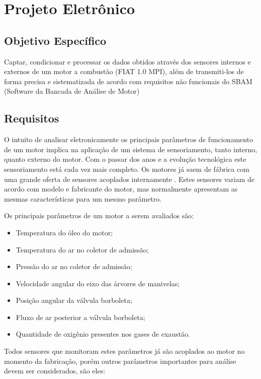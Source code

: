 \chapter[Projeto Eletrônico]{Projeto Eletrônico}

\section{Objetivo Específico}

Captar, condicionar e processar os dados obtidos através dos sensores internos e externos de um motor a combustão (FIAT 1.0 MPI), além de transmiti-los de forma precisa e sistematizada de acordo com requisitos não funcionais do SBAM (Software da Bancada de Análise de Motor)

\section{Requisitos}

O intuito de analisar eletronicamente os principais parâmetros de funcionamento de um motor implica na aplicação de um sistema de sensoriamento, tanto interno, quanto externo do motor. Com o passar dos anos e a evolução tecnológica este sensoriamento está cada vez mais completo. Os motores já saem de fábrica com uma grande oferta de sensores acoplados internamente \cite{valle2004mapping}. Estes sensores variam de acordo com modelo e fabricante do motor, mas normalmente apresentam as mesmas características para um mesmo parâmetro.

Os principais parâmetros de um motor a serem avaliados são:

\begin{itemize}
	\item Temperatura do óleo do motor;
	\item Temperatura do ar no coletor de admissão;
	\item Pressão do ar no coletor de admissão;
	\item Velocidade angular do eixo das árvores de manivelas;
	\item Posição angular da válvula borboleta;
	\item Fluxo de ar posterior a válvula borboleta;
	\item Quantidade de oxigênio presentes nos gases de exaustão.
\end{itemize}

Todos sensores que monitoram estes parâmetros já são acoplados ao motor no momento da fabricação, porém outros parâmetros importantes para análise devem ser considerados, são eles:

